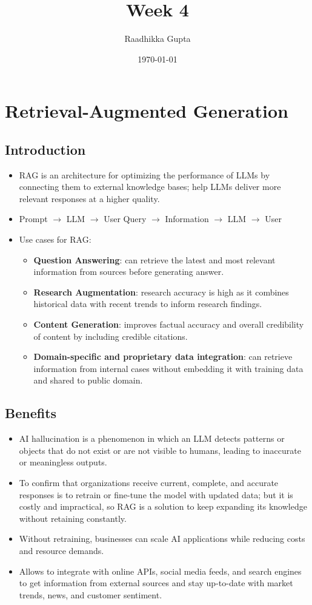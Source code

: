 \documentclass[12pt, letterpaper]{article}
\title{Week 4}
\author{Raadhikka Gupta}
\date{\today}
\begin{document}
\maketitle

\section{Retrieval-Augmented Generation}
\subsection{Introduction}
\begin{itemize}
    \item RAG is an architecture for optimizing the performance of LLMs by connecting them to external knowledge bases; help LLMs deliver more relevant responses at a higher quality.
    \item Prompt $\rightarrow$ LLM $\rightarrow$ User Query $\rightarrow$ Information $\rightarrow$ LLM $\rightarrow$ User
    \item Use cases for RAG:
        \begin{itemize}
            \item \textbf{Question Answering}: can retrieve the latest and most relevant information from sources before generating answer.
            \item \textbf{Research Augmentation}: research accuracy is high as it combines historical data with recent trends to inform research findings.
            \item \textbf{Content Generation}: improves factual accuracy and overall credibility of content by including credible citations.
            \item \textbf{Domain-specific and proprietary data integration}: can retrieve information from internal cases without embedding it with training data and shared to public domain.
        \end{itemize}
\end{itemize}

\subsection{Benefits}
\begin{itemize}
    \item AI hallucination is a phenomenon in which an LLM detects patterns or objects that do not exist or are not visible to humans, leading to inaccurate or meaningless outputs.
    \item To confirm that organizations receive current, complete, and accurate responses is to retrain or fine-tune the model with updated data; but it is costly and impractical, so RAG is a solution to keep expanding its knowledge without retaining constantly.
    \item Without retraining, businesses can scale AI applications while reducing costs and resource demands.
    \item Allows to integrate with online APIs, social media feeds, and search engines to get information from external sources and stay up-to-date with market trends, news, and customer sentiment.
\end{itemize}
\end{document}
